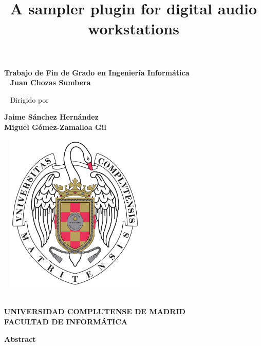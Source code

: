 \documentclass[12pt, a4paper, hidelinks]{article}
\title{\textbf{A sampler plugin for digital audio workstations}}
\date{\vspace{-10ex}}
\begin{document}
	\maketitle
	\begin{center}
		\textbf{Trabajo de Fin de Grado en Ingeniería Informática}\\
		
		~\newline
		\textbf{\large{Juan Chozas Sumbera}}
		
		~\newline
		Dirigido por
		
		\textbf{Jaime Sánchez Hernández\\
		Miguel Gómez-Zamalloa Gil}
		
		
		~\newline
		\includegraphics[width=0.5\textwidth]{logo_UCM.png}\\
		~\newline
		
		\textbf{\large{UNIVERSIDAD COMPLUTENSE DE MADRID}}\\
		
		\textbf{FACULTAD DE INFORMÁTICA}
	\end{center}

	
	
	\newpage

	
	\newpage
	\huge
	\textbf{Abstract}\\
\end{document}

